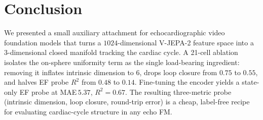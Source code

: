 \documentclass[runningheads]{llncs}
\begin{document}
\section{Conclusion}\label{sec:conclusion}

We presented a small auxiliary attachment for echocardiographic video
foundation models that turns a $1024$-dimensional V-JEPA-2 feature space
into a $3$-dimensional closed manifold tracking the cardiac cycle. A
21-cell ablation isolates the on-sphere uniformity term as the single
load-bearing ingredient: removing it inflates intrinsic dimension to
$6$, drops loop closure from $0.75$ to $0.55$, and halves EF probe
$R^2$ from $0.48$ to $0.14$. Fine-tuning the encoder yields a
state-only EF probe at MAE\,$5.37$, $R^2{=}0.67$. The resulting
three-metric probe (intrinsic dimension, loop closure, round-trip
error) is a cheap, label-free recipe for evaluating cardiac-cycle
structure in any echo FM.



\end{document}

